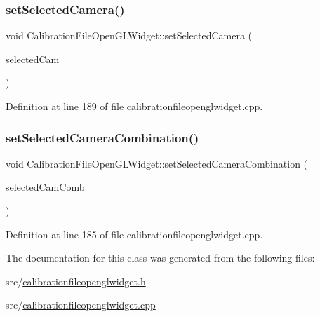 \subsubsection{\texorpdfstring{setSelectedCamera()}{setSelectedCamera()}}
{\footnotesize\ttfamily void Calibration\+File\+Open\+G\+L\+Widget\+::set\+Selected\+Camera (\begin{DoxyParamCaption}\item[{int}]{selected\+Cam }\end{DoxyParamCaption})}



Definition at line 189 of file calibrationfileopenglwidget.\+cpp.

\mbox{\label{class_calibration_file_open_g_l_widget_a99d70084688c048c2371cf055c7e4224}} 
\subsubsection{\texorpdfstring{setSelectedCameraCombination()}{setSelectedCameraCombination()}}
{\footnotesize\ttfamily void Calibration\+File\+Open\+G\+L\+Widget\+::set\+Selected\+Camera\+Combination (\begin{DoxyParamCaption}\item[{\mbox{\hyperlink{struct_track_point_1_1_camera_combination}{Track\+Point\+::\+Camera\+Combination}} $\ast$}]{selected\+Cam\+Comb }\end{DoxyParamCaption})}



Definition at line 185 of file calibrationfileopenglwidget.\+cpp.



The documentation for this class was generated from the following files\+:\begin{DoxyCompactItemize}
\item 
src/\mbox{\hyperlink{calibrationfileopenglwidget_8h}{calibrationfileopenglwidget.\+h}}\item 
src/\mbox{\hyperlink{calibrationfileopenglwidget_8cpp}{calibrationfileopenglwidget.\+cpp}}\end{DoxyCompactItemize}
